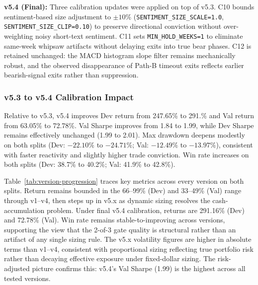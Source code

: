 \documentclass[11pt,twoside,a4paper]{article}
\begin{document}
\textbf{v5.4 (Final):} Three calibration updates were applied on top of v5.3. C10 bounds sentiment-based size adjustment to $\pm 10\%$ (\texttt{SENTIMENT\_SIZE\_SCALE=1.0}, \texttt{SENTIMENT\_SIZE\_CLIP=0.10}) to preserve directional conviction without over-weighting noisy short-text sentiment. C11 sets \texttt{MIN\_HOLD\_WEEKS=1} to eliminate same-week whipsaw artifacts without delaying exits into true bear phases. C12 is retained unchanged: the MACD histogram slope filter remains mechanically robust, and the observed disappearance of Path-B timeout exits reflects earlier bearish-signal exits rather than suppression.

\subsubsection*{v5.3 to v5.4 Calibration Impact}
Relative to v5.3, v5.4 improves Dev return from 247.65\% to 291.\% and Val return from 63.05\% to 72.78\%. Val Sharpe improves from 1.84 to 1.99, while Dev Sharpe remains effectively unchanged (1.99 to 2.01). Max drawdown deepens modestly on both splits (Dev: $-22.10\%$ to $-24.71\%$; Val: $-12.49\%$ to $-13.97\%$), consistent with faster reactivity and slightly higher trade conviction. Win rate increases on both splits (Dev: 38.7\% to 40.2\%; Val: 41.9\% to 42.8\%).

Table~\ref{tab:version-progression} traces key metrics across every version on both splits. Return remains bounded in the 66--99\% (Dev) and 33--49\% (Val) range through v1--v4, then steps up in v5.x as dynamic sizing resolves the cash-accumulation problem. Under final v5.4 calibration, returns are 291.16\% (Dev) and 72.78\% (Val). Win rate remains stable-to-improving across versions, supporting the view that the 2-of-3 gate quality is structural rather than an artifact of any single sizing rule. The v5.x volatility figures are higher in absolute terms than v1--v4, consistent with proportional sizing reflecting true portfolio risk rather than decaying effective exposure under fixed-dollar sizing. The risk-adjusted picture confirms this: v5.4's Val Sharpe (1.99) is the highest across all tested versions.
\end{document}

